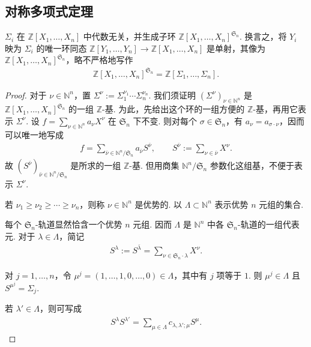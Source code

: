 \subsection{对称多项式定理}\label{sec:galois-2-9-3}
\begin{theorem*}$\Sigma_i$ 在 $\mathbb Z[X_1,\ldots,X_n]$ 中代数无关，并生成子环 $\mathbb Z[X_1,\ldots,X_n]^{\mathfrak S_n}$. 换言之，将 $Y_i$ 映为 $\Sigma_i$ 的唯一环同态 $\mathbb Z[Y_1,\ldots,Y_n]\to\mathbb Z[X_1,\ldots,X_n]$ 是单射，其像为 $\mathbb Z[X_1,\ldots,X_n]^{\mathfrak S_n}$，略不严格地写作
\begin{align*}
\mathbb Z[X_1,\ldots,X_n]^{\mathfrak S_n}=\mathbb Z[\Sigma_1,\ldots,\Sigma_n].
\end{align*}\end{theorem*}
\begin{proof}
对于 $\nu\in\mathbb N^n$，置 $\Sigma^\nu:=\Sigma_1^{\nu_1}\cdots\Sigma_n^{\nu_n}$. 我们须证明 $(\Sigma^\nu)_{\nu\in\mathbb N^n}$ 是 $\mathbb Z[X_1,\ldots,X_n]^{\mathfrak S_n}$ 的一组 $\mathbb Z$-基.
为此，先给出这个环的一组方便的 $\mathbb Z$-基，再用它表示 $\Sigma^\nu$. 设 $f=\sum_{\nu\in\mathbb N^n}a_\nu X^\nu$ 在 $\mathfrak S_n$ 下不变. 则对每个 $\sigma\in\mathfrak S_n$，有 $a_\nu=a_{\sigma\cdot\nu}$，因而可以唯一地写成
\begin{align*}
f=\sum_{\bar\nu\in\mathbb N^n/\mathfrak S_n}a_{\bar\nu}S^{\bar\nu},\qquad S^{\bar\nu}:=\sum_{\nu\in\bar\nu}X^\nu.
\end{align*}
故 $(S^{\bar\nu})_{\bar\nu\in\mathbb N^n/\mathfrak S_n}$ 是所求的一组 $\mathbb Z$-基. 但用商集 $\mathbb N^n/\mathfrak S_n$ 参数化这组基，不便于表示 $\Sigma^\nu$.
\begin{definition*}若 $\nu_1\geq\nu_2\geq\cdots\geq\nu_n$，则称 $\nu\in\mathbb N^n$ 是优势的. 以 $\Lambda\subset\mathbb N^n$ 表示优势 $n$ 元组的集合.\end{definition*}
每个 $\mathfrak S_n$-轨道显然恰含一个优势 $n$ 元组. 因而 $\Lambda$ 是 $\mathbb N^n$ 中各 $\mathfrak S_n$-轨道的一组代表元. 对于 $\lambda\in\Lambda$，简记
\begin{align*}
S^\lambda:=S^{\bar\lambda}=\sum_{\nu\in\mathfrak S_n\cdot\lambda}X^\nu.
\end{align*}
\begin{example*}对 $j=1,\ldots,n$，令 $\mu^j=(1,\ldots,1,0,\ldots,0)\in\Lambda$，其中有 $j$ 项等于 $1$. 则 $\mu^j\in\Lambda$ 且 $S^{\mu^j}=\Sigma_j$.\end{example*}
若 $\lambda'\in\Lambda$，则可写成
\begin{align*}
S^\lambda S^{\lambda'}=\sum_{\mu\in\Lambda}c_{\lambda,\lambda';\mu}S^\mu.\tag{$*$}\label{eq:galois-symmetric-product}

\end{align*}
\end{proof}
